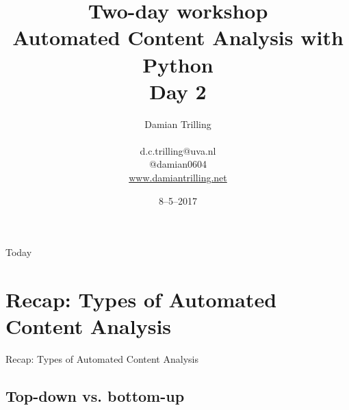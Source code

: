 \documentclass{beamer}
\begin{document}
\title[Automated Content Analysis with Python]{\textbf{Two-day workshop\\ Automated Content Analysis with Python} \\ Day 2}
\author[Damian Trilling]{Damian Trilling \\ ~ \\ \footnotesize{d.c.trilling@uva.nl \\@damian0604} \\ \url{www.damiantrilling.net}}
\date{8--5--2017}

\begin{frame}{}
\titlepage
\end{frame}

\begin{frame}{Today}
\tableofcontents
\end{frame}




\section[Recap]{Recap: Types of Automated Content Analysis}
\begin{frame}{}
Recap: Types of Automated Content Analysis
\end{frame}
\subsection*{Top-down vs. bottom-up}


\begin{frame}[plain]
\end{frame}
\end{document}
